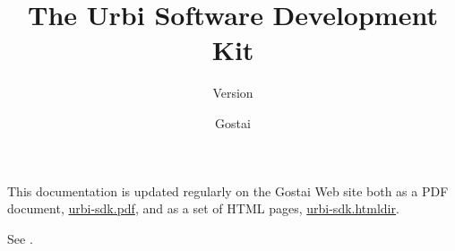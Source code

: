\documentclass[openright,twoside,11pt,final]{book}
\title{The Urbi Software Development Kit}
\subtitle{Version \VcsDescription}
\author{Gostai}
\begin{document}
\maketitle

This documentation is updated regularly on the Gostai Web site both as
a PDF document, \href{\docurl/urbi-sdk.pdf}{urbi-sdk.pdf}, and as a
set of HTML pages, \href{\docurl/urbi-sdk.htmldir}{urbi-sdk.htmldir}.

See \href{\docurl}{\docurl}.



\tableofcontents







{
  
}

\end{document}
